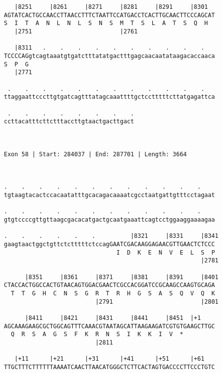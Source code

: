 \documentclass{article}
\begin{document}
\begin{Verbatim}
   |8251     |8261     |8271     |8281     |8291     |8301  
AGTATCACTGCCAACCTTAACCTTTCTAATTCCATGACCTCACTTGCAACTTCCCAGCAT
S  I  T  A  N  L  N  L  S  N  S  M  T  S  L  A  T  S  Q  H  
   |2751                         |2761                      
  
   |8311   .    .    .    .    .    .    .    .    .    .   
TCCCCAGgtcagtaaatgtgatctttatatgactttgagcaacaatataagacaccaaca
S  P  G                                                     
   |2771                                                    
  
 .    .    .    .    .    .    .    .    .    .    .    .   
ttaggaattcccttgtgatcagtttatagcaaattttgctcctttttcttatgagattca
                                                            
 .    .    .    .    .    .    .    .
ccttacatttcttctttaccttgtaactgacttgact
                                     
                                     
 
Exon 58 | Start: 284037 | End: 287701 | Length: 3664



.    .    .    .    .    .    .    .    .    .    .    .    
tgtaagtacactccacaatatttgcacagacaaaatcgcctaatgattgtttcctagaat
                                                            
.    .    .    .    .    .    .    .    .    .    .    .    
gtgtccccgttgttaagcgacacatgactgcaatgaaattcagtcctggaaggaaaagaa
                                                            
.    .    .    .    .    .          |8321     |8331     |8341
gaagtaactggctgttctctttttctccagGAATCGACAAGGAGAACGTTGAACTCTCCC
                                I  D  K  E  N  V  E  L  S  P
                                                        |2781
  
      |8351     |8361     |8371     |8381     |8391     |8401
CTACCACTGGCCACTGTAACAGTGGACGAACTCGCCACGGATCCGCAAGCCAAGTGCAGA
  T  T  G  H  C  N  S  G  R  T  R  H  G  S  A  S  Q  V  Q  K
                          |2791                         |2801
  
      |8411     |8421     |8431     |8441     |8451  |+1    
AGCAAAGAAGCGCTGGCAGTTTCAAACGTAATAGCATTAAGAAGATCGTGTGAAGCTTGC
  Q  R  S  A  G  S  F  K  R  N  S  I  K  K  I  V  *   
                          |2811                             
  
   |+11      |+21      |+31      |+41      |+51      |+61   
TTGCTTTCTTTTTTAAAATCAACTTAACATGGGCTCTTCACTAGTGACCCCTTCCCTGTC
                                                            

\end{Verbatim}
\end{document}
